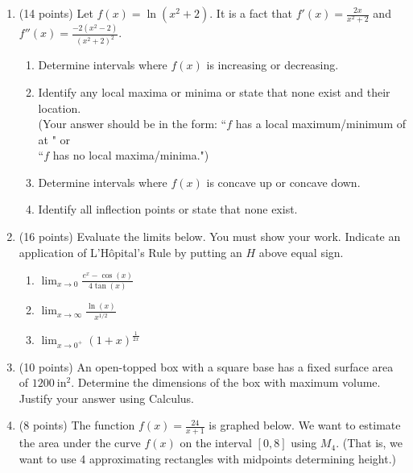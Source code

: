 \documentclass[12pt]{article}
\begin{document}
\begin{enumerate}
\newpage
\item (14 points) Let $\displaystyle f(x)=\ln(x^2+2).$ It is a fact that $\displaystyle f'(x)=\frac{2x}{x^2+2}$ and $\displaystyle f''(x)=\frac{-2(x^2-2)}{(x^2+2)^2}.$
\begin{enumerate}
	\item Determine intervals where $f(x)$ is increasing or decreasing.
	\vfill
	\item Identify any local maxima or minima or state that none exist and their location. \\(Your answer should be in the form: ``$f$ has a local maximum/minimum of \underline{\hspace{.3in}} at \underline{\hspace{.3in}}" or \\``$f$ has no local maxima/minima.")
	\vspace{1.5in}
	\item Determine intervals where $f(x)$ is concave up or concave down.
	\vfill
	\item Identify all inflection points or state that none exist.
	\vspace{1in}
	\end{enumerate}
\newpage
\item (16 points) Evaluate the limits below. You must show your work. Indicate an application of L'H\^{o}pital's Rule by putting an $H$ above equal sign.
\begin{enumerate}
	\item $\displaystyle \lim_{x \to 0} \frac{e^x-\cos(x)}{4\tan(x)}$
	\vfill
	\item $\displaystyle \lim_{x \to \infty} \frac{\ln(x)}{x^{1/2}}$
	\vfill
	\item $\displaystyle \lim_{x \to 0^+} \left( 1+ x \right)^{\frac{1}{2x}}$
	\vfill
\end{enumerate}

\newpage



\item (10 points) An open-topped box with a square base has a fixed surface area of $1200 \: \text{in}^2.$ Determine the dimensions of the box with maximum volume. Justify your answer using Calculus.

\newpage


\item (8 points) The function $f(x)=\frac{24}{x+1}$ is graphed below. We want to estimate the area under the curve $f(x)$ on the interval $[0,8]$ using $M_4.$ (That is, we want to use 4 approximating rectangles with midpoints determining height.) 


\end{enumerate}
\end{document}
